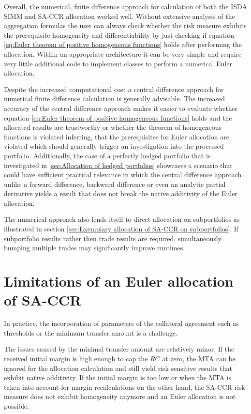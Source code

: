 \documentclass[../Thesis_AHoecherl.tex]{subfiles}
\begin{document}
    Overall, the numerical, finite difference approach for calculation of both the \gls{ISDA SIMM} and \gls{SA-CCR} allocation worked well. Without extensive analysis of the aggregation formulas the user can always check whether the risk measure exhibits the prerequisite homogeneity and differentiability by just checking if equation \ref{eq:Euler theorem of positive homogeneous functions} holds after performing the allocation. 
    Within an appropriate architecture it can be very simple and require very little additional code to implement classes to perform a numerical Euler allocation.
    
    Despite the increased computational cost a central difference approach for numerical finite difference calculation is generally advisable.
    The increased accuracy of the central difference approach makes it easier to evaluate whether equation \ref{eq:Euler theorem of positive homogeneous functions} holds and the allocated results are trustworthy or whether the theorem of homogeneous functions is violated inferring, that the prerequisites for Euler allocation are violated which should generally trigger an investigation into the processed portfolio.
    Additionally, the case of a perfectly hedged portfolio that is investigated in \ref{sec:Allocation of hedged portfolios} showcases a scenario that could have sufficient practical relevance in which the central difference approach unlike a forward difference, backward difference or even an analytic partial derivative yields a result that does not break the native additivity of the Euler allocation.

    The numerical approach also lends itself to direct allocation on subportfolios as illustrated in section \ref{sec:Exemplary allocation of SA-CCR on subportfolios}.
    If subportfolio results rather then trade results are required, simultaneously bumping multiple trades may significantly improve runtimes.

    \section{Limitations of an Euler allocation of SA-CCR\label{Limitations of an Euler allocation of SA-CCR}}

    In practice, the incorporation of parameters of the collateral agreement such as thresholds or the minimum transfer amount is a challenge.

    The issues caused by the minimal transfer amount are relatively minor.
    If the received initial margin is high enough to cap the $RC$ at zero, the \gls{MTA} can be ignored for the allocation calculation and still yield risk sensitive results that exhibit native additivity. If the initial margin is too low or when the \gls{MTA} is taken into account for margin recalculations on the other hand, the \gls{SA-CCR} risk measure does not exhibit homogeneity anymore and an Euler allocation is not possible.
    
\end{document}
